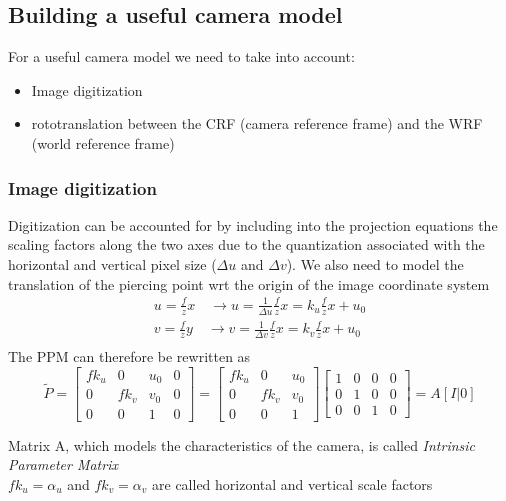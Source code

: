 \documentclass{article}
\begin{document}
\subsection{Building a useful camera model}
For a useful camera model we need to take into account:
\begin{itemize}
    \item Image digitization
    \item rototranslation between the CRF (camera reference frame) and the WRF (world reference frame)
\end{itemize}
\subsubsection{Image digitization}
Digitization can be accounted for by including into the projection equations the scaling factors along the two axes due to the quantization associated with the horizontal and vertical pixel size ($\Delta u$ and $\Delta v$). We also need to model the translation of the piercing point wrt the origin of the image coordinate system
\begin{gather*}
    u=\frac{f}{z}x \quad \rightarrow u = \frac{1}{\Delta u} \frac{f}{z}x=k_u\frac{f}{z}x+u_0 \\
    v=\frac{f}{z}y \quad \rightarrow v = \frac{1}{\Delta v} \frac{f}{z}x=k_v\frac{f}{z}x+u_0 \\
\end{gather*}
The PPM can therefore be rewritten as
\begin{equation}
    \tilde{P}=\begin{bmatrix}
        fk_u & 0 & u_0 & 0 \\
        0 & fk_v & v_0 & 0 \\
        0 & 0 & 1 & 0
    \end{bmatrix}=\begin{bmatrix}
        fk_u & 0 & u_0 \\
        0 & fk_v & v_0 \\
        0 & 0 & 1
    \end{bmatrix} \begin{bmatrix}
        1 & 0 & 0 & 0 \\
        0 & 1 & 0 & 0 \\
        0 & 0 & 1 & 0 
    \end{bmatrix} = A[I|0]
\end{equation}

Matrix A, which models the characteristics of the camera, is called \emph{Intrinsic Parameter Matrix}\\
$fk_u=\alpha_u$ and $fk_v=\alpha_v$ are called horizontal and vertical scale factors
\end{document}
